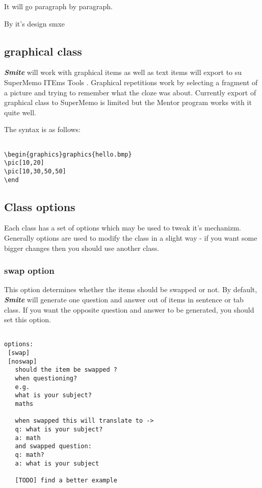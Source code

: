 \documentclass[a4paper,11pt]{article}
\newcommand{\smite}{\emph{\textbf{Smite{}}}}
\begin{document}
It will go paragraph by paragraph.

By it's design smxe


\subsection{graphical class}
\smite{} will work with graphical items as well as text items will export to su
SuperMemo ITEms Tools .  Graphical repetitions work by selecting a fragment of
a picture and trying to remember what the cloze was about.  Currently export of
graphical class to SuperMemo is limited but the Mentor program works with it
quite well.

The syntax is as follows:

\begin{verbatim}

\begin{graphics}graphics{hello.bmp}
\pic[10,20]
\pic[10,30,50,50]
\end

\end{verbatim}
\subsection{Class options}

Each class has a set of options which may be used to tweak it's mechanizm.
Generally options are used to modify the class in a slight way - if you want
some bigger changes then you should use another class.


\subsubsection{swap option}

This option determines whether the items should be swapped or not. By default,
\smite{} will generate one question and answer out of items in sentence or tab
class.  If you want the opposite question and answer to be generated, you
should set this option.

\begin{verbatim}

options:
 [swap]
 [noswap]
   should the item be swapped ?
   when questioning?
   e.g.
   what is your subject?
   maths

   when swapped this will translate to ->
   q: what is your subject?
   a: math
   and swapped question:
   q: math?
   a: what is your subject

   [TODO] find a better example


\end{verbatim}
\end{document}
